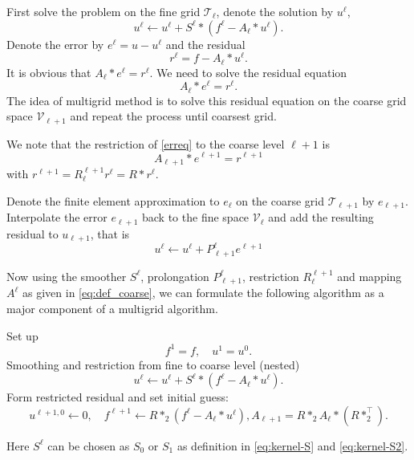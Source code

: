 First solve the problem on the fine grid $\mathcal T_{\ell}$, denote the solution by $u^{\ell}$, 
\begin{equation}\label{eq:smoothing0}
u^{\ell} \leftarrow u^{\ell} + S^\ell \ast (f^\ell - A_\ell \ast u^{\ell}).
\end{equation}
Denote the error by $e^\ell=u-u^{\ell}$ and the residual
\begin{equation}\label{eq:formresidual}
r^{\ell}=f-A_{\ell}\ast u^{\ell}.
\end{equation}
It is obvious that $A_{\ell}\ast e^\ell=r^{\ell}.$
We need to solve the residual equation
\begin{equation}\label{erreq}
A_{\ell}\ast e^\ell=r^{\ell}.
\end{equation}
The idea of multigrid method is to solve this residual equation on the coarse grid space $\mathcal V_{\ell+1}$ 
and repeat the process until coarsest grid. 

We note that the restriction of \eqref{erreq} to the coarse level $\ell+1$ is
\begin{equation}\label{coarse:correc}
A_{\ell+1}\ast e^{\ell+1}=r^{\ell+1}
\end{equation}
with $r^{\ell+1}=R_\ell^{\ell+1}r^\ell=R\ast r^\ell$.

Denote the finite element approximation to $e_\ell$ on the coarse grid $\mathcal T_{\ell+1}$ by $e_{\ell+1}$. Interpolate the error $e_{\ell+1}$ back to the fine space $\mathcal V_{\ell}$ and add the resulting residual to $u_{\ell+1}$, that is 
\begin{equation}\label{eq:prolongation00}
u^\ell \leftarrow u^{\ell}+P^{\ell}_{\ell+1}e^{\ell+1}
\end{equation}


Now using the smoother $S^\ell$, prolongation $P^{\ell}_{\ell+1}$, restriction $R_{\ell}^{\ell+1}$ and mapping
$A^\ell$ as given in \eqref{eq:def_coarse}, we can formulate the following algorithm
 as a major component of a multigrid algorithm.
\begin{breakablealgorithm}%
	\caption{$(u^{1}, u^2, \cdots, u^J) = {\text{MG0}}(f; u^0; J,\nu_1, \cdots, \nu_J)$}
	\label{alg:L-Slash0}
	\begin{algorithmic}
		\State Set up
		$$
		f^1 = f, \quad u^{1}=u^0.
		$$
		\State Smoothing and restriction from fine to coarse level (nested)
		\State
		\begin{equation}\label{eq:smoothing}
		u^{\ell} \leftarrow u^{\ell} + S^\ell \ast (f^\ell - A_\ell \ast u^{\ell}).
		\end{equation}
		\EndFor
		\State Form restricted residual and set initial guess:
		$$
		u^{\ell+1,0} \leftarrow 0, \quad f^{\ell+1} \leftarrow R \ast_2 (f^\ell -  A_\ell \ast u^{\ell}), A_{\ell+1} = R \ast_2 A_\ell \ast (R\ast_2^\top).
		$$
		\EndFor
	\end{algorithmic}
\end{breakablealgorithm}
Here $S^\ell$ can be chosen as $S_0$ or $S_1$ as definition in \eqref{eq:kernel-S} and \eqref{eq:kernel-S2}.

